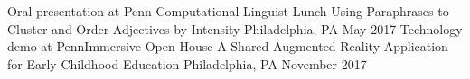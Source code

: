 \begin{cventries}
  \cventrynobullet
    {Oral presentation at Penn Computational Linguist Lunch}
    {Using Paraphrases to Cluster and Order Adjectives by Intensity}
    {Philadelphia, PA}
    {May 2017}
    {}
  \cventrynobullet
    {Technology demo at PennImmersive Open House}
    {A Shared Augmented Reality Application for Early Childhood Education}
    {Philadelphia, PA}
    {November 2017}
    {}
\end{cventries}
